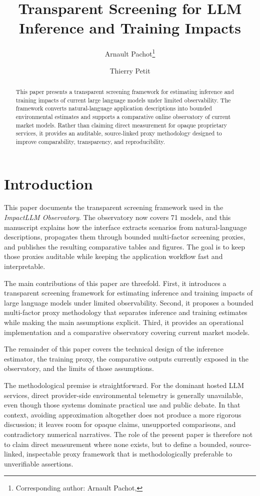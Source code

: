 \documentclass[runningheads]{llncs}
\title{Transparent Screening for LLM Inference and Training Impacts}
\author{Arnault Pachot\inst{1}\thanks{Corresponding author: Arnault Pachot, \email{apachot@emotia.com}} \and Thierry Petit\inst{1}}
\institute{Emotia, Paris, France\\
\email{\{apachot,tpetit\}@emotia.com}}
\begin{document}
\maketitle

\begin{abstract}
This paper presents a transparent screening framework for estimating inference and training impacts of current large language models under limited observability. The framework converts natural-language application descriptions into bounded environmental estimates and supports a comparative online observatory of current market models. Rather than claiming direct measurement for opaque proprietary services, it provides an auditable, source-linked proxy methodology designed to improve comparability, transparency, and reproducibility.

\end{abstract}

\section{Introduction}
This paper documents the transparent screening framework used in the \emph{ImpactLLM Observatory}. The observatory now covers 71 models, and this manuscript explains how the interface extracts scenarios from natural-language descriptions, propagates them through bounded multi-factor screening proxies, and publishes the resulting comparative tables and figures. The goal is to keep those proxies auditable while keeping the application workflow fast and interpretable.

The main contributions of this paper are threefold. First, it introduces a transparent screening framework for estimating inference and training impacts of large language models under limited observability. Second, it proposes a bounded multi-factor proxy methodology that separates inference and training estimates while making the main assumptions explicit. Third, it provides an operational implementation and a comparative observatory covering current market models.

The remainder of this paper covers the technical design of the inference estimator, the training proxy, the comparative outputs currently exposed in the observatory, and the limits of those assumptions.

The methodological premise is straightforward. For the dominant hosted LLM services, direct provider-side environmental telemetry is generally unavailable, even though those systems dominate practical use and public debate. In that context, avoiding approximation altogether does not produce a more rigorous discussion; it leaves room for opaque claims, unsupported comparisons, and contradictory numerical narratives. The role of the present paper is therefore not to claim direct measurement where none exists, but to define a bounded, source-linked, inspectable proxy framework that is methodologically preferable to unverifiable assertions.
\end{document}
